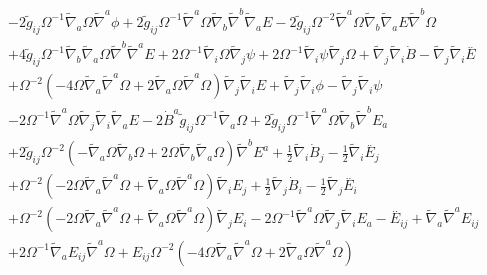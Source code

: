 \documentclass[10pt,letterpaper]{article}
\numberwithin{equation}{section}
\begin{document}
\begin{eqnarray}
&& - 2 \tilde{g}_{ij} \Omega^{-1} \tilde{\nabla}_{a}\Omega \tilde{\nabla}^{a}\phi + 2 \tilde{g}_{ij} \Omega^{-1} \tilde{\nabla}^{a}\Omega \tilde{\nabla}_{b}\tilde{\nabla}^{b}\tilde{\nabla}_{a}E - 2 \tilde{g}_{ij} \Omega^{-2} \tilde{\nabla}^{a}\Omega \tilde{\nabla}_{b}\tilde{\nabla}_{a}E \tilde{\nabla}^{b}\Omega \nonumber \\ 
&& + 4 \tilde{g}_{ij} \Omega^{-1} \tilde{\nabla}_{b}\tilde{\nabla}_{a}\Omega \tilde{\nabla}^{b}\tilde{\nabla}^{a}E + 2 \Omega^{-1} \tilde{\nabla}_{i}\Omega \tilde{\nabla}_{j}\psi + 2 \Omega^{-1} \tilde{\nabla}_{i}\psi \tilde{\nabla}_{j}\Omega + \tilde{\nabla}_{j}\tilde{\nabla}_{i}\dot{B} -  \tilde{\nabla}_{j}\tilde{\nabla}_{i}\overset{..}{E} \nonumber \\ 
&& + \Omega^{-2} (-4 \Omega \tilde{\nabla}_{a}\tilde{\nabla}^{a}\Omega + 2 \tilde{\nabla}_{a}\Omega \tilde{\nabla}^{a}\Omega) \tilde{\nabla}_{j}\tilde{\nabla}_{i}E + \tilde{\nabla}_{j}\tilde{\nabla}_{i}\phi -  \tilde{\nabla}_{j}\tilde{\nabla}_{i}\psi \nonumber \\ 
&& - 2 \Omega^{-1} \tilde{\nabla}^{a}\Omega \tilde{\nabla}_{j}\tilde{\nabla}_{i}\tilde{\nabla}_{a}E-2 \dot{B}^{a} \tilde{g}_{ij} \Omega^{-1} \tilde{\nabla}_{a}\Omega + 2 \tilde{g}_{ij} \Omega^{-1} \tilde{\nabla}^{a}\Omega \tilde{\nabla}_{b}\tilde{\nabla}^{b}E_{a} \nonumber \\ 
&& + 2 \tilde{g}_{ij} \Omega^{-2} (- \tilde{\nabla}_{a}\Omega \tilde{\nabla}_{b}\Omega + 2 \Omega \tilde{\nabla}_{b}\tilde{\nabla}_{a}\Omega) \tilde{\nabla}^{b}E^{a} + \tfrac{1}{2} \tilde{\nabla}_{i}\dot{B}_{j} -  \tfrac{1}{2} \tilde{\nabla}_{i}\overset{..}{E}_{j} \nonumber \\ 
&& + \Omega^{-2} (-2 \Omega \tilde{\nabla}_{a}\tilde{\nabla}^{a}\Omega + \tilde{\nabla}_{a}\Omega \tilde{\nabla}^{a}\Omega) \tilde{\nabla}_{i}E_{j} + \tfrac{1}{2} \tilde{\nabla}_{j}\dot{B}_{i} -  \tfrac{1}{2} \tilde{\nabla}_{j}\overset{..}{E}_{i} \nonumber \\ 
&& + \Omega^{-2} (-2 \Omega \tilde{\nabla}_{a}\tilde{\nabla}^{a}\Omega + \tilde{\nabla}_{a}\Omega \tilde{\nabla}^{a}\Omega) \tilde{\nabla}_{j}E_{i} - 2 \Omega^{-1} \tilde{\nabla}^{a}\Omega \tilde{\nabla}_{j}\tilde{\nabla}_{i}E_{a}- \overset{..}{E}_{ij} + \tilde{\nabla}_{a}\tilde{\nabla}^{a}E_{ij} \nonumber \\ 
&& + 2 \Omega^{-1} \tilde{\nabla}_{a}E_{ij} \tilde{\nabla}^{a}\Omega + E_{ij} \Omega^{-2} (-4 \Omega \tilde{\nabla}_{a}\tilde{\nabla}^{a}\Omega + 2 \tilde{\nabla}_{a}\Omega \tilde{\nabla}^{a}\Omega) \nonumber \\ 

\end{eqnarray}
\end{document}

